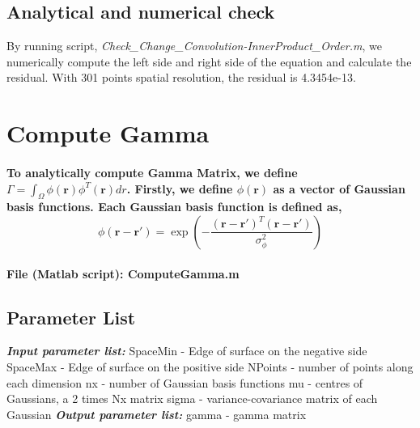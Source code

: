 \documentclass[a4paper, 12pt, english]{article}
\begin{document}
    

\subsection{Analytical and numerical check}
By running script, \textit{Check_Change_Convolution-InnerProduct_Order.m}, we numerically
compute the left side and right side of the equation and calculate the residual.
With 301 points spatial resolution, the residual is 4.3454e-13.

\newpage

\section{Compute Gamma}

\paragraph{To analytically compute Gamma Matrix, we define
$\Gamma=\int_{\Omega}\phi(\boldsymbol{r})\phi^{T}(\boldsymbol{r})dr$.
Firstly, we define $\phi(\boldsymbol{r})$ as a vector of Gaussian basis functions.
Each Gaussian basis function is defined as,
$$\phi(\boldsymbol{r}-\boldsymbol{r}\prime)=\exp{\left(-\frac{(\boldsymbol{r}-\boldsymbol{r}\prime)^{T}(\boldsymbol{r}-\boldsymbol{r}\prime)}{\sigma_{\phi}^{2}}\right)}$$}

\paragraph{File (Matlab script): ComputeGamma.m}

\subsection{Parameter List}
\textbf{\textit{Input parameter list:}}\newline
SpaceMin - Edge of surface on the negative side\newline
SpaceMax - Edge of surface on the positive side\newline
NPoints - number of points along each dimension\newline
nx - number of Gaussian basis functions\newline
mu - centres of Gaussians, a 2 times Nx matrix\newline
sigma - variance-covariance matrix of each Gaussian\newline
\textbf{\textit{Output parameter list:}}\newline
gamma - gamma matrix
\end{document}

